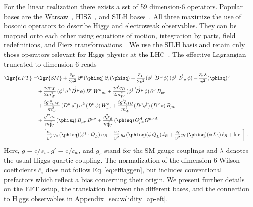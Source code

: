 For the linear realization there exists a set of 59 dimension-6
operators. Popular bases are the Warsaw~\cite{Grzadkowski:2010es},
HISZ~\cite{Hagiwara:1993ck}, and SILH bases~\cite{silh}. All three
maximize the use of bosonic operators to describe Higgs and
electroweak observables. They can be mapped onto each other using
equations of motion, integration by parts, field redefinitions, and
Fierz transformations~\cite{Alonso:2014rga}.  We use the SILH basis
and retain only those operators relevant for Higgs physics at the
LHC~\cite{silh}.  The effective Lagrangian truncated to dimension 6
reads
%
\begin{align}
  \label{eq:EFT} \lgr{EFT} =& \lgr{SM} + \frac{\bar{c}_H}{2v^2}
\, \partial^\mu (\phisq) \, \partial_\mu (\phisq) +
\frac{\bar{c}_T}{2v^2} \, (\phi^\dagger \, \overleftrightarrow{D}^\mu
\, \phi) \, (\phi^\dagger \, \overleftrightarrow{D}_\mu \, \phi)
-\frac{\bar{c}_6\lambda}{v^2} (\phisq)^3 \notag \\ &+
\frac{ig\bar{c}_W}{2m^2_W} \, (\phi^\dagger \, \sigma^k
\overleftrightarrow{D}^\mu\phi) \, D^\nu \, {W^k}_{\mu\nu} +
\frac{ig'\bar{c}_B}{2m_W^2} \, (\phi^\dagger \,
\overleftrightarrow{D}^\mu \, \phi) \, \partial^\nu \, B_{\mu\nu}
\notag \\ &+ \frac{ig \, \bar{c}_{HW}}{m_W^2} \, (D^\mu \,
\phi^\dagger) \, \sigma^k \, (D^\nu \, \phi) \, W^k_{\mu\nu} +
\frac{ig'\bar{c}_{HB}}{m_W^2} (D^\mu\phi^\dagger) \, (D^\nu \, \phi)
\, B_{\mu\nu}\notag \\ &+ \frac{g'^2 \bar{c}_\gamma}{m_W^2} \,
(\phisq) \, B_{\mu\nu} \, B^{\mu\nu} + \frac{g_s^2 \bar{c}_g}{m_W^2}
\, (\phisq) \, G^A_{\mu\nu} \, G^{\mu\nu\, A} \notag \\ &- \left[
\frac{\bar{c}_u}{v^2} \, y_u \, (\phisq) (\phi^\dagger\cdot \,
\overline{Q}_L) \, u_R + \frac{\bar{c}_d}{v^2} \, y_d \, (\phisq)
(\phi \, \overline{Q}_L) \, d_R + \frac{\bar{c}_\ell}{v^2} \, y_\ell
\, (\phisq) (\phi \, \overline{L}_L) \, \ell_R + \text{h.c.} \,
\right] \,.
\end{align}
%
Here, $g = e/{s_w}, g' = e/{c_w}$, and $g_s$ stand for the SM gauge
couplings and $\lambda$ denotes the usual Higgs quartic coupling. The
normalization of the dimension-6 Wilson coefficients $\overline{c}_i$
does not follow Eq.\,\eqref{eq:efflaggen}, but includes conventional
prefactors which reflect a bias concerning their origin. We present
further details on the EFT setup, the translation between the
different bases, and the connection to Higgs observables in
Appendix~\ref{sec:validity_ap-eft}.




